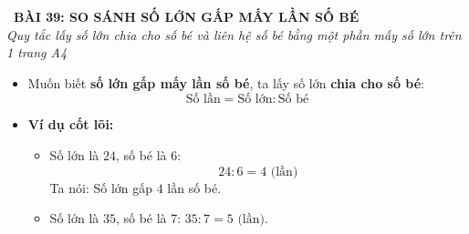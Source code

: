 \documentclass[11pt,a4paper]{article}
\begin{document}
\begin{tcolorbox}[
  enhanced,
  colback=white,
  colframe=primary,
  arc=3mm,
  boxrule=1.2pt,
  left=4mm, right=4mm, top=2.5mm, bottom=2.5mm,
  drop shadow=black!10!white
]
  \centering
  {\Large\bfseries\color{primary}\faBookmark\ BÀI 39: SO SÁNH SỐ LỚN GẤP MẤY LẦN SỐ BÉ}\\[1.5mm]
  {\small\itshape\color{black!75}Quy tắc lấy số lớn chia cho số bé và liên hệ số bé bằng một phần mấy số lớn trên 1 trang A4}
\end{tcolorbox}

\vspace{-2mm}


\noindent
\begin{minipage}[t]{0.49\textwidth}\vspace{0pt}
\begin{tcolorbox}[
  enhanced,
  colback=blue!4!white,
  colframe=blue!75!black,
  arc=2mm, boxrule=0.8pt,
  left=2mm, right=2mm, top=1.8mm, bottom=1.8mm,
  title={\footnotesize\bfseries\color{white}\faKey\ 1. Quy tắc so sánh gấp số lần}
]
{\footnotesize
\begin{itemize}\setlength{\itemsep}{1.5pt}\setlength{\leftskip}{-2.5mm}
  \item Muốn biết \textbf{số lớn gấp mấy lần số bé}, ta lấy số lớn \textbf{chia cho số bé}:
  $$\text{Số lần} = \text{Số lớn} : \text{Số bé}$$
  \item \textbf{Ví dụ cốt lõi:}
  \begin{itemize}\setlength{\itemsep}{1pt}\setlength{\leftskip}{-2.5mm}
    \item Số lớn là $24$, số bé là $6$:
    $$24 : 6 = 4\text{ (lần)}$$
    Ta nói: Số lớn gấp $4$ lần số bé.
    \item Số lớn là $35$, số bé là $7$: $35 : 7 = 5\text{ (lần)}$.
  \end{itemize}
\end{itemize}
}
\end{tcolorbox}
\end{minipage}
\hfill
\end{document}
